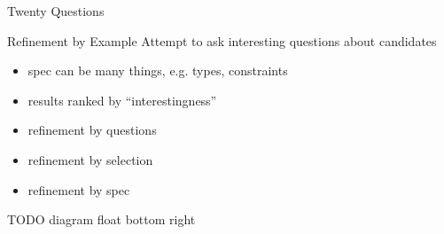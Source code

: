 \begin{frame}{Twenty Questions}
  \begin{block}{Refinement by Example}
    Attempt to ask interesting questions about candidates

    \begin{itemize}
      \item spec can be many things, e.g. types, constraints
      \item results ranked by ``interestingness''
      \item refinement by questions
      \item refinement by selection
      \item refinement by spec
    \end{itemize}

    TODO diagram float bottom right
  \end{block}
\end{frame}
